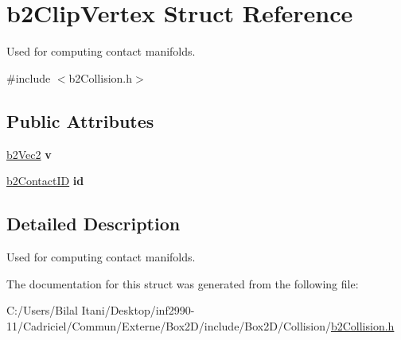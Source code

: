 \hypertarget{structb2_clip_vertex}{}\section{b2\+Clip\+Vertex Struct Reference}
\label{structb2_clip_vertex}


Used for computing contact manifolds.  




{\ttfamily \#include $<$b2\+Collision.\+h$>$}

\subsection*{Public Attributes}
\begin{DoxyCompactItemize}
\item 
\hyperlink{structb2_vec2}{b2\+Vec2} {\bfseries v}\hypertarget{structb2_clip_vertex_a6c8d8e4c0667755d5295a9c0d91d5b87}{}\label{structb2_clip_vertex_a6c8d8e4c0667755d5295a9c0d91d5b87}

\item 
\hyperlink{unionb2_contact_i_d}{b2\+Contact\+ID} {\bfseries id}\hypertarget{structb2_clip_vertex_ac0f6d48eafc40a665bc18d4aa821689d}{}\label{structb2_clip_vertex_ac0f6d48eafc40a665bc18d4aa821689d}

\end{DoxyCompactItemize}


\subsection{Detailed Description}
Used for computing contact manifolds. 

The documentation for this struct was generated from the following file\+:\begin{DoxyCompactItemize}
\item 
C\+:/\+Users/\+Bilal Itani/\+Desktop/inf2990-\/11/\+Cadriciel/\+Commun/\+Externe/\+Box2\+D/include/\+Box2\+D/\+Collision/\hyperlink{b2_collision_8h}{b2\+Collision.\+h}\end{DoxyCompactItemize}
